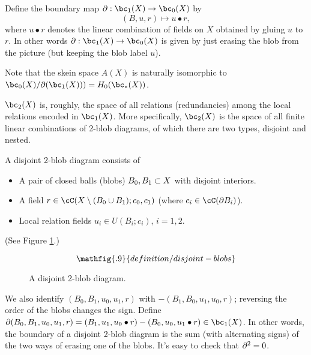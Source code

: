 Define the boundary map $\bd : \bc_1(X) \to \bc_0(X)$ by 
\[ 
	(B, u, r) \mapsto u\bullet r, 
\]
where $u\bullet r$ denotes the linear
combination of fields on $X$ obtained by gluing $u$ to $r$.
In other words $\bd : \bc_1(X) \to \bc_0(X)$ is given by
just erasing the blob from the picture
(but keeping the blob label $u$).

Note that the skein space $A(X)$
is naturally isomorphic to $\bc_0(X)/\bd(\bc_1(X))) = H_0(\bc_*(X))$.

$\bc_2(X)$ is, roughly, the space of all relations (redundancies) among the 
local relations encoded in $\bc_1(X)$.
More specifically, $\bc_2(X)$ is the space of all finite linear combinations of
2-blob diagrams, of which there are two types, disjoint and nested.

A disjoint 2-blob diagram consists of
\begin{itemize}
\item A pair of closed balls (blobs) $B_0, B_1 \subset X$ with disjoint interiors.
\item A field $r \in \cC(X \setmin (B_0 \cup B_1); c_0, c_1)$
(where $c_i \in \cC(\bd B_i)$).
\item Local relation fields $u_i \in U(B_i; c_i)$, $i=1,2$. 
\end{itemize}
(See Figure \ref{blob2ddiagram}.)
\begin{figure}[!ht]\begin{equation*}
\mathfig{.9}{definition/disjoint-blobs}
\end{equation*}\caption{A disjoint 2-blob diagram.}\label{blob2ddiagram}\end{figure}
We also identify $(B_0, B_1, u_0, u_1, r)$ with $-(B_1, B_0, u_1, u_0, r)$;
reversing the order of the blobs changes the sign.
Define $\bd(B_0, B_1, u_0, u_1, r) = 
(B_1, u_1, u_0\bullet r) - (B_0, u_0, u_1\bullet r) \in \bc_1(X)$.
In other words, the boundary of a disjoint 2-blob diagram
is the sum (with alternating signs)
of the two ways of erasing one of the blobs.
It's easy to check that $\partial^2 = 0$.

